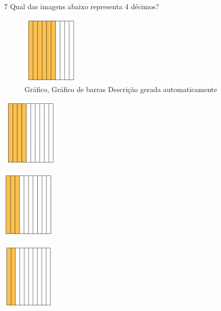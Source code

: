 \begin{escolha}
{%

\num{7} Qual das imagens abaixo representa 4 décimos?

\begin{escolha}

\item
  \begin{figure}
  \centering
  \includegraphics[width=1.0625in,height=1.28788in]{./_SAEB_9_MAT/media/image47.png}
  \caption{Gráfico, Gráfico de barras Descrição gerada automaticamente}
  \end{figure}

\item
  \includegraphics[width=1.07728in,height=1.29167in]{./_SAEB_9_MAT/media/image48.png}

\item
  \includegraphics[width=1.00521in,height=1.25518in]{./_SAEB_9_MAT/media/image49.png}

\item
  \includegraphics[width=0.9751in,height=1.25in]{./_SAEB_9_MAT/media/image50.png}
\end{escolha}

}
\end{escolha}
